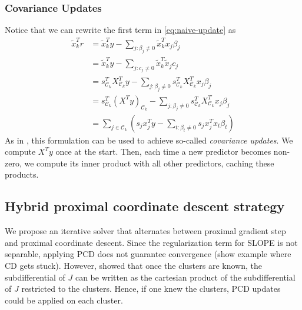 \subsubsection{Covariance Updates}

Notice that we can rewrite the first term in \eqref{eq:naive-update} as
\begin{equation}
  \begin{aligned}
    \tilde x_k^T r & = \tilde x_k^T y - \sum_{j : \beta_j \neq 0} \tilde x_k^T x_j \beta_j                                                                    \\
                   & = \tilde x_k^T y - \sum_{j : c_j \neq 0} \tilde x_k^T \tilde x_j c_j                                                                     \\
                   & = s_{\mathcal{C}_k}^T X_{\mathcal{C}_k}^T y - \sum_{j : \beta_j \neq 0} s_{\mathcal{C}_k}^T X_{\mathcal{C}_k}^T x_j \beta_j              \\
                   & = s_{\mathcal{C}_k}^T \left(X^T y\right)_{\mathcal{C}_k} - \sum_{j : \beta_j \neq 0} s_{\mathcal{C}_k}^T X_{\mathcal{C}_k}^T x_j \beta_j \\
                   & = \sum_{j \in \mathcal{C}_k}\left( s_j x_j^Ty - \sum_{t : \beta_t \neq 0} s_j x_j^T x_t \beta_t \right)
  \end{aligned}
\end{equation}
As in \textcite{friedman2010}, this formulation can be used to achieve so-called \emph{covariance updates}.
We compute \(X^T y\) once at the start.
Then, each time a new predictor becomes non-zero, we compute its inner product with all other predictors, caching these products.

\subsection{Hybrid proximal coordinate descent strategy}

We propose an iterative solver that alternates between proximal gradient step and proximal coordinate descent.
Since the regularization term for SLOPE is not separable, applying PCD does not guarantee convergence (show example where CD gets stuck).
However, \cite{dupuis2021} showed that once the clusters are known, the subdifferential of $J$ can be written as the cartesian product of the subdifferential of $J$ restricted to the clusters.
Hence, if one knew the clusters, PCD updates could be applied on each cluster.

